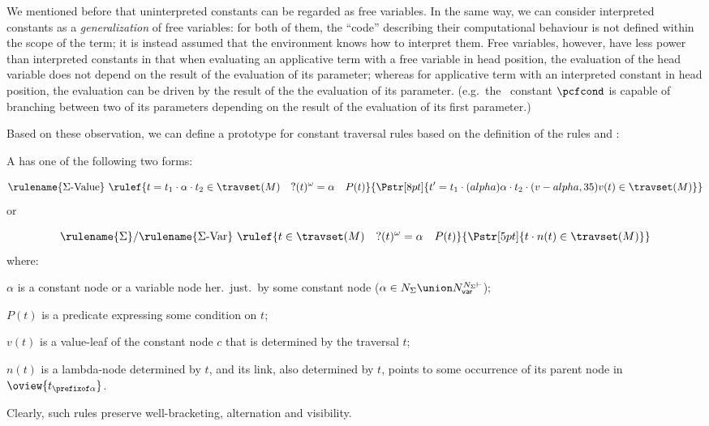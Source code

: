 We mentioned before that uninterpreted constants can be regarded as
free variables. In the same way, we can consider interpreted
constants as a \emph{generalization} of free variables: for both of
them, the ``code'' describing their computational behaviour is not
defined within the scope of the term; it is instead assumed that the
environment knows how to interpret them. Free variables, however,
have less power than interpreted constants in that when evaluating
an applicative term with a free variable in head position, the
evaluation of the head variable does not depend on the result of the
evaluation of its parameter; whereas for applicative term with an
interpreted constant in head position, the evaluation can be driven
by the result of the the evaluation of its parameter. (e.g.\ the
\pcf\ constant $\pcfcond$ is capable of branching between two of its
parameters depending on the result of the evaluation of its first
parameter.)

Based on these observation, we can define a prototype for constant
traversal rules based on the definition of the rules
 and :
\begin{definition}
    \label{def:constant_traversal} A  has
    one of the following two forms:
        $$\rulename{\Sigma\mbox{-Value}}\ \rulef{t = t_1\cdot \alpha \cdot t_2 \in \travset(M) \quad ?(t)^\omega = \alpha \quad P(t)}
          {
            \stackrel{\rule{0pt}{3pt} }{
                \Pstr[8pt]{ t' = t_1\cdot (alpha){\alpha} \cdot t_2 \cdot (v-alpha,35){v(t)} \in {\travset(M)}}
                }
           }
           $$
    or
    $$\rulename{\Sigma}/\rulename{\Sigma\mbox{-Var}}\ \rulef{t \in \travset(M) \quad ?(t)^\omega = \alpha \quad P(t)}
      { \stackrel{  \rule{0pt}{3pt} }{\Pstr[5pt]{ t \cdot {n(t)} \in {\travset(M)}}}
       }$$
        where:
        \begin{compactitem}
          \item $\alpha$ is a constant node or a variable node her.\ just.\ by some constant node ($\alpha \in N_\Sigma \union N^{N_\Sigma\vdash}_{\sf var}$);
          \item $P(t)$ is a predicate expressing some condition on $t$;
          \item $v(t)$ is a value-leaf of the constant node $c$ that is determined by the traversal $t$;
          \item $n(t)$ is a lambda-node determined by $t$, and its link, also determined by $t$, points to some occurrence of its parent node in $\oview{t_{\prefixof \alpha}}$.
        \end{compactitem}
    Clearly, such rules preserve well-bracketing, alternation and
    visibility.
\end{definition}


